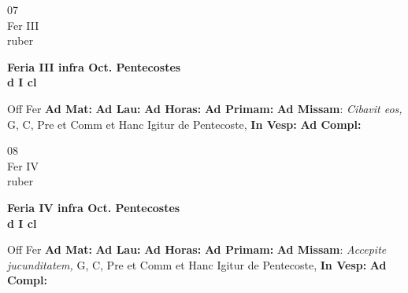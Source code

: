 \documentclass[10pt, openany]{book}
\begin{document}
    \begin{center}
        \begin{minipage}{3.5in}
            \vspace{2em}
            \begin{minipage}{0.5in}
                {\Huge 07} \\
                {\normalsize Fer III} \\
                {\normalsize ruber}
            \end{minipage}
            \begin{minipage}{3.0in}
                \textbf{ \large Feria III infra Oct. Pentecostes \\
                \textnormal{\normalsize d I cl}} \\ 
            \end{minipage}
            \begin{justify}Off Fer
                \textbf{Ad Mat: }
                \textbf{Ad Lau: }
                \textbf{Ad Horas: }
                \textbf{Ad Primam: }\textbf{Ad Missam}: \textit{Cibavit eos,} G, C, Pre et Comm et Hanc Igitur de Pentecoste,  
                \textbf{In Vesp: }
                \textbf{Ad Compl: }
            \end{justify}
        \end{minipage}
    \end{center}

    \begin{center}
        \begin{minipage}{3.5in}
            \vspace{2em}
            \begin{minipage}{0.5in}
                {\Huge 08} \\
                {\normalsize Fer IV} \\
                {\normalsize ruber}
            \end{minipage}
            \begin{minipage}{3.0in}
                \textbf{ \large Feria IV infra Oct. Pentecostes \\
                \textnormal{\normalsize d I cl}} \\ 
            \end{minipage}
            \begin{justify}Off Fer
                \textbf{Ad Mat: }
                \textbf{Ad Lau: }
                \textbf{Ad Horas: }
                \textbf{Ad Primam: }\textbf{Ad Missam}: \textit{Accepite jucunditatem,} G, C, Pre et Comm et Hanc Igitur de Pentecoste,  
                \textbf{In Vesp: }
                \textbf{Ad Compl: }
            \end{justify}
        \end{minipage}
    \end{center}
\end{document}
